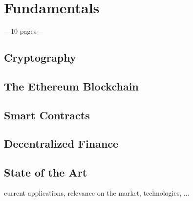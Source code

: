 \chapter{Fundamentals}
\label{cha:Fundamentals}

---10 pages---

\section{Cryptography}
\section{The Ethereum Blockchain}
\section{Smart Contracts}
\section{Decentralized Finance}
\section{State of the Art}
current applications, relevance on the market, technologies, ...